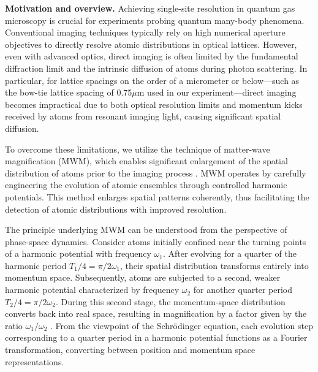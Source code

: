 
\textbf{Motivation and overview.} 
Achieving single-site resolution in quantum gas microscopy is crucial for experiments probing quantum many-body phenomena. Conventional imaging techniques typically rely on high numerical aperture objectives to directly resolve atomic distributions in optical lattices. However, even with advanced optics, direct imaging is often limited by the fundamental diffraction limit and the intrinsic diffusion of atoms during photon scattering. In particular, for lattice spacings on the order of a micrometer or below—such as the bow-tie lattice spacing of 0.75$\mu$m used in our experiment—direct imaging becomes impractical due to both optical resolution limits and momentum kicks received by atoms from resonant imaging light, causing significant spatial diffusion.

To overcome these limitations, we utilize the technique of matter-wave magnification (MWM), which enables significant enlargement of the spatial distribution of atoms prior to the imaging process \cite{huang_construction_2024}. MWM operates by carefully engineering the evolution of atomic ensembles through controlled harmonic potentials. This method enlarges spatial patterns coherently, thus facilitating the detection of atomic distributions with improved resolution.

The principle underlying MWM can be understood from the perspective of phase-space dynamics. Consider atoms initially confined near the turning points of a harmonic potential with frequency $\omega_1$. After evolving for a quarter of the harmonic period $T_1/4=\pi/2\omega_1$, their spatial distribution transforms entirely into momentum space. Subsequently, atoms are subjected to a second, weaker harmonic potential characterized by frequency $\omega_2$ for another quarter period $T_2/4=\pi/2\omega_2$. During this second stage, the momentum-space distribution converts back into real space, resulting in magnification by a factor given by the ratio $\omega_1/\omega_2$ \cite{huang_construction_2024}. From the viewpoint of the Schrödinger equation, each evolution step corresponding to a quarter period in a harmonic potential functions as a Fourier transformation, converting between position and momentum space representations.


